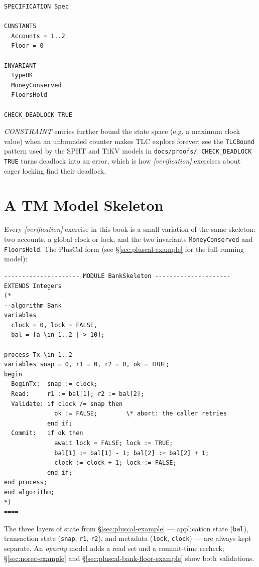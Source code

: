 \begin{lstlisting}[language={}, caption={A TLC configuration file.}]
SPECIFICATION Spec

CONSTANTS
  Accounts = 1..2
  Floor = 0

INVARIANT
  TypeOK
  MoneyConserved
  FloorsHold

CHECK_DEADLOCK TRUE
\end{lstlisting}

\emph{CONSTRAINT} entries further bound the state space (e.g. a maximum
clock value) when an unbounded counter makes TLC explore forever; see the
\texttt{TLCBound} pattern used by the SPHT and TiKV models in
\texttt{docs/proofs/}.  \texttt{CHECK\_DEADLOCK TRUE} turns deadlock into an
error, which is how \emph{[verification]} exercises about eager locking
find their deadlock.

\section{A TM Model Skeleton}

Every \emph{[verification]} exercise in this book is a small variation of
the same skeleton: two accounts, a global clock or lock, and the two
invariants \texttt{MoneyConserved} and \texttt{FloorsHold}.  The PlusCal
form (see \S\ref{sec:pluscal-example} for the full running model):

\begin{lstlisting}[language={}, caption={The shared shape of every TM model in the book.}]
--------------------- MODULE BankSkeleton ---------------------
EXTENDS Integers
(*
--algorithm Bank
variables
  clock = 0, lock = FALSE,
  bal = [a \in 1..2 |-> 10];

process Tx \in 1..2
variables snap = 0, r1 = 0, r2 = 0, ok = TRUE;
begin
  BeginTx:  snap := clock;
  Read:     r1 := bal[1]; r2 := bal[2];
  Validate: if clock /= snap then
              ok := FALSE;        \* abort: the caller retries
            end if;
  Commit:   if ok then
              await lock = FALSE; lock := TRUE;
              bal[1] := bal[1] - 1; bal[2] := bal[2] + 1;
              clock := clock + 1; lock := FALSE;
            end if;
end process;
end algorithm;
*)
====
\end{lstlisting}

The three layers of state from \S\ref{sec:pluscal-example} --- application
state (\texttt{bal}), transaction state (\texttt{snap}, \texttt{r1},
\texttt{r2}), and metadata (\texttt{lock}, \texttt{clock}) --- are always
kept separate.  An \emph{opacity} model adds a read set and a
commit-time recheck; \S\ref{sec:norec-example} and
\S\ref{sec:pluscal-bank-floor-example} show both validations.

